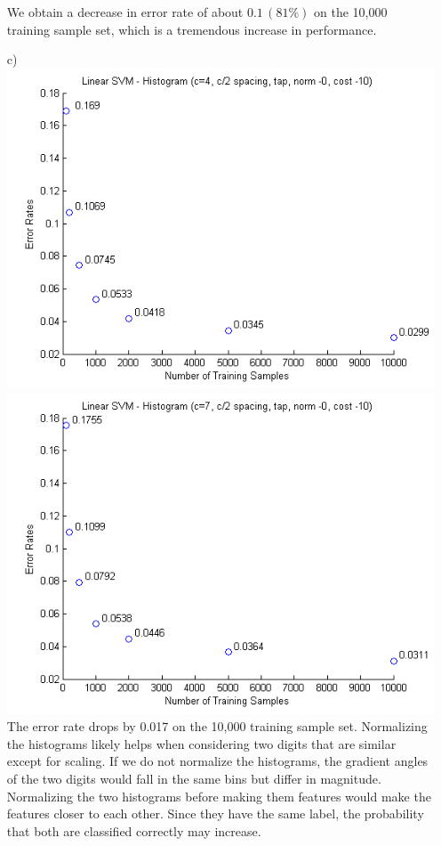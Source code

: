 \documentclass[11pt]{article}
\begin{document}
\begin{itemize}
We obtain a decrease in error rate of about $0.1\,(81\%)$ on the 10,000 training sample set, which is a tremendous increase in performance.
\item[c)]
\includegraphics[scale=0.6]{diagrams/Question13c1.png}
\includegraphics[scale=0.6]{diagrams/Question13c2.png}\\
The error rate drops by 0.017 on the 10,000 training sample set. Normalizing the histograms likely helps when considering two digits that are similar except for scaling. If we do not normalize the histograms, the gradient angles of the two digits would fall in the same bins but differ in magnitude. Normalizing the two histograms before making them features would make the features closer to each other. Since they have the same label, the probability that both are classified correctly may increase.

\end{itemize}
\end{document}
